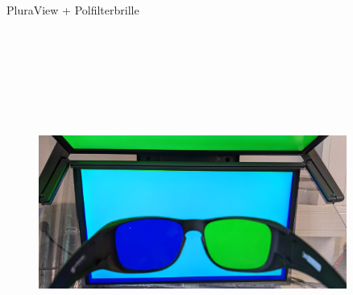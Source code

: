 \documentclass[final,hyperref={pdfpagelabels=false}]{beamer}
\begin{document}
\begin{frame}[t]
\begin{columns}[t]
\begin{column}{.465\textwidth}
\end{column}


\begin{column}{.025\textwidth}\end{column} %

\begin{column}{0.465\textwidth}

\begin{block}{PluraView + Polfilterbrille}
   \begin{figure}
       \includegraphics[height=12cm]{pluraviewBrille}
   \end{figure}
    



\end{block}
\end{column}
\end{columns}
\end{frame}
\end{document}
